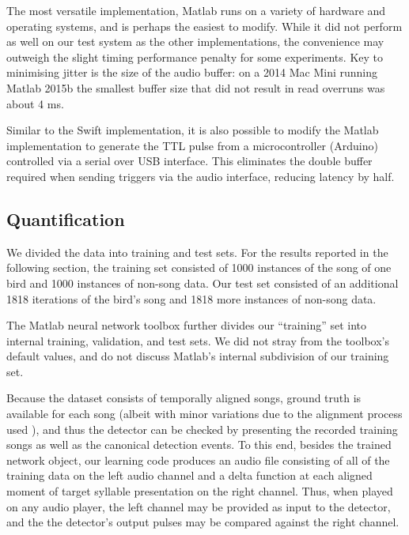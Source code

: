 \documentclass[10pt,letterpaper]{article}
\begin{document}
The most versatile implementation, Matlab runs on a variety of hardware and operating systems, and is perhaps the easiest to modify.  While it did not perform as well on our test system as the other implementations, the convenience may outweigh the slight timing performance penalty for some experiments.  Key to minimising jitter is the size of the audio buffer: on a 2014 Mac Mini running Matlab 2015b the smallest buffer size that did not result in read overruns was about 4 ms.

Similar to the Swift implementation, it is also possible to modify the Matlab implementation to generate the TTL pulse from a microcontroller (Arduino) controlled via a serial over USB interface. This eliminates the double buffer required when sending triggers via the audio interface, reducing latency by half.

\subsection{Quantification}
\label{sec:quantify}

We divided the data into training and test sets.  For the results reported in the following section, the training set consisted of 1000 instances of the song of one bird and 1000 instances of non-song data.  Our test set consisted of an additional 1818 iterations of the bird's song and 1818 more instances of non-song data.

The Matlab neural network toolbox further divides our ``training'' set into internal training, validation, and test sets.  We did not stray from the toolbox's default values, and do not discuss Matlab's internal subdivision of our training set. %

Because the dataset consists of temporally aligned songs, ground truth is available for each song (albeit with minor variations due to the alignment process used \cite{Poole2012}), and thus the detector can be checked by
presenting the recorded training songs as well as the canonical
detection events. To this end, besides the trained network object, our
learning code produces an audio file consisting of all of the training
data on the left audio channel and a delta function at each aligned moment of
target syllable presentation on the right channel. Thus, when
played on any audio player, the left channel may be provided as input
to the detector, and the the detector's output pulses may be compared against the right channel.
\end{document}
